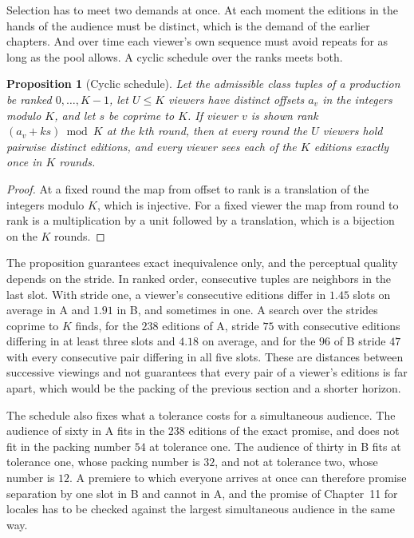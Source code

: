 \documentclass[11pt,twoside,openright]{book}
\theoremstyle{plain}
\newtheorem{proposition}[theorem]{Proposition}
\theoremstyle{definition}
\theoremstyle{remark}
\begin{document}
Selection has to meet two demands at once. At each moment the editions in the hands of the audience must be distinct, which is the demand of the earlier chapters. And over time each viewer's own sequence must avoid repeats for as long as the pool allows. A cyclic schedule over the ranks meets both.

\begin{proposition}[Cyclic schedule]\label{prop:cyclic}
Let the admissible class tuples of a production be ranked $0,\dots,K-1$, let $U\le K$ viewers have distinct offsets $a_v$ in the integers modulo $K$, and let $s$ be coprime to $K$. If viewer $v$ is shown rank $(a_v+ks)\bmod K$ at the $k$th round, then at every round the $U$ viewers hold pairwise distinct editions, and every viewer sees each of the $K$ editions exactly once in $K$ rounds.
\end{proposition}

\begin{proof}
At a fixed round the map from offset to rank is a translation of the integers modulo $K$, which is injective. For a fixed viewer the map from round to rank is a multiplication by a unit followed by a translation, which is a bijection on the $K$ rounds.
\end{proof}

The proposition guarantees exact inequivalence only, and the perceptual quality depends on the stride. In ranked order, consecutive tuples are neighbors in the last slot. With stride one, a viewer's consecutive editions differ in $1.45$ slots on average in A and $1.91$ in B, and sometimes in one. A search over the strides coprime to $K$ finds, for the $238$ editions of A, stride $75$ with consecutive editions differing in at least three slots and $4.18$ on average, and for the $96$ of B stride $47$ with every consecutive pair differing in all five slots. These are distances between successive viewings and not guarantees that every pair of a viewer's editions is far apart, which would be the packing of the previous section and a shorter horizon.

The schedule also fixes what a tolerance costs for a simultaneous audience. The audience of sixty in A fits in the $238$ editions of the exact promise, and does not fit in the packing number $54$ at tolerance one. The audience of thirty in B fits at tolerance one, whose packing number is $32$, and not at tolerance two, whose number is $12$. A premiere to which everyone arrives at once can therefore promise separation by one slot in B and cannot in A, and the promise of Chapter~11 for locales has to be checked against the largest simultaneous audience in the same way.
\end{document}
